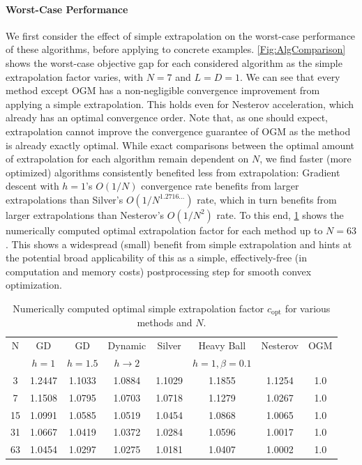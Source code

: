 \documentclass[11pt]{article}
\numberwithin{equation}{section}
\theoremstyle{definition}
\theoremstyle{definition}
\theoremstyle{definition}
\newcommand{\1}{\mathbf{1}}
\newcommand{\cOpt}{c_{\text{opt}}}
\begin{document}
\paragraph{Worst-Case Performance} We first consider the effect of simple extrapolation on the worst-case performance of these algorithms, before applying to concrete examples. \cref{Fig:AlgComparison} shows the worst-case objective gap for each considered algorithm as the simple extrapolation factor varies, with $N=7$ and $L=D=1$. We can see that every method except OGM has a non-negligible convergence improvement from applying a simple extrapolation. This holds even for Nesterov acceleration, which already has an optimal convergence order.
Note that, as one should expect, extrapolation cannot improve the convergence guarantee of OGM as the method is already exactly optimal. While exact comparisons between the optimal amount of extrapolation for each algorithm remain dependent on $N$, we find faster (more optimized) algorithms consistently benefited less from extrapolation: Gradient descent with $h=1$'s $O(1/N)$ convergence rate benefits from larger extrapolations than Silver's $O(1/N^{1.2716\dots})$ rate, which in turn benefits from larger extrapolations than Nesterov's $O(1/N^2)$ rate. To this end, \cref{Tbl:cOptData} shows the numerically computed optimal extrapolation factor for each method up to $N=63$. This shows a widespread (small) benefit from simple extrapolation and hints at the potential broad applicability of this as a simple, effectively-free (in computation and memory costs) postprocessing step for smooth convex optimization.

\begin{table}
    \centering\footnotesize
    \begin{tabular}{|c|c|c|c|c|c|c|c|}
    \hline
         N & GD & GD & Dynamic & Silver & Heavy Ball & Nesterov & OGM\\
         & $h=1$ & $h=1.5$ & $h \to 2$ & & $h=1,\beta=0.1$ & & \\
         \hline
         3  & 1.2447 & 1.1033 & 1.0884 & 1.1029 & 1.1855 & 1.1254 & 1.0 \\
         7  & 1.1508 & 1.0795 & 1.0703 & 1.0718 & 1.1279 & 1.0267 & 1.0 \\
         15 & 1.0991 & 1.0585 & 1.0519 & 1.0454 & 1.0868 & 1.0065 & 1.0 \\
         31 & 1.0667 & 1.0419 & 1.0372 & 1.0284 & 1.0596 & 1.0017 & 1.0 \\
         63 & 1.0454 & 1.0297 & 1.0275 & 1.0181 & 1.0407 & 1.0002 & 1.0 \\
         \hline
    \end{tabular}
    \caption{Numerically computed optimal simple extrapolation factor $\cOpt$ for various methods and $N$.}
    \label{Tbl:cOptData}
\end{table}
\end{document}
